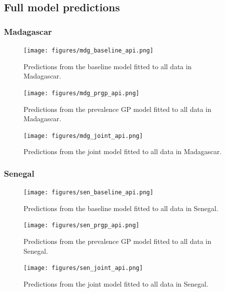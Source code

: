 \documentclass[10pt,a4]{article}
\begin{document}
\clearpage
\subsection{Full model predictions}
\subsubsection{Madagascar}

\begin{figure}[h!]
\centering

\texttt{[image: figures/mdg\_baseline\_api.png]}

\caption{Predictions from the baseline model fitted to all data in Madagascar.}
\end{figure}
\begin{figure}[h!]
\centering

\texttt{[image: figures/mdg\_prgp\_api.png]}

\caption{Predictions from the prevalence GP model fitted to all data in Madagascar.}
\end{figure}

\begin{figure}[h!]
\centering

\texttt{[image: figures/mdg\_joint\_api.png]}

\caption{Predictions from the joint model fitted to all data in Madagascar.}
\end{figure}




\subsubsection{Senegal}


\begin{figure}[h!]
\centering

\texttt{[image: figures/sen\_baseline\_api.png]}

\caption{Predictions from the baseline model fitted to all data in Senegal.}
\end{figure}
\begin{figure}[h!]
\centering

\texttt{[image: figures/sen\_prgp\_api.png]}

\caption{Predictions from the prevalence GP model fitted to all data in Senegal.}
\end{figure}

\begin{figure}[h!]
\centering

\texttt{[image: figures/sen\_joint\_api.png]}

\caption{Predictions from the joint model fitted to all data in Senegal.}
\end{figure}
\end{document}
